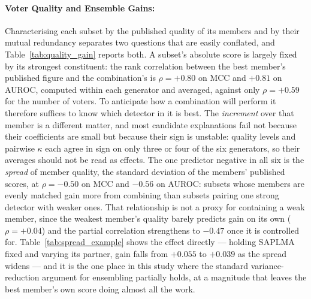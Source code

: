 \paragraph{Voter Quality and Ensemble Gains:}
Characterising each subset by the published quality of its members and by their mutual
redundancy separates two questions that are easily conflated, and
Table~\ref{tab:quality_gain} reports both. A subset's absolute score is largely fixed by its
strongest constituent: the rank correlation between the best member's published figure and
the combination's is $\rho = +0.80$ on MCC and $+0.81$ on AUROC, computed within each
generator and averaged, against only $\rho = +0.59$ for the number of voters. To anticipate
how a combination will perform it therefore suffices to know which detector in it is best.
The \emph{increment} over that member is a different matter, and most candidate explanations
fail not because their coefficients are small but because their sign is unstable: quality
levels and pairwise $\kappa$ each agree in sign on only three or four of the six generators,
so their averages should not be read as effects. The one predictor negative in all six is
the \emph{spread} of member quality, the standard deviation of the members' published
scores, at $\rho = -0.50$ on MCC and $-0.56$ on AUROC: subsets whose members are evenly
matched gain more from combining than subsets pairing one strong detector with weaker ones.
That relationship is not a proxy for containing a weak member, since the weakest member's
quality barely predicts gain on its own ($\rho = +0.04$) and the partial correlation
strengthens to $-0.47$ once it is controlled for. Table~\ref{tab:spread_example} shows the
effect directly --- holding SAPLMA fixed and varying its partner, gain falls from $+0.055$ to
$+0.039$ as the spread widens --- and it is the one place in this study where the standard
variance-reduction argument for ensembling partially holds, at a magnitude that leaves the
best member's own score doing almost all the work.

